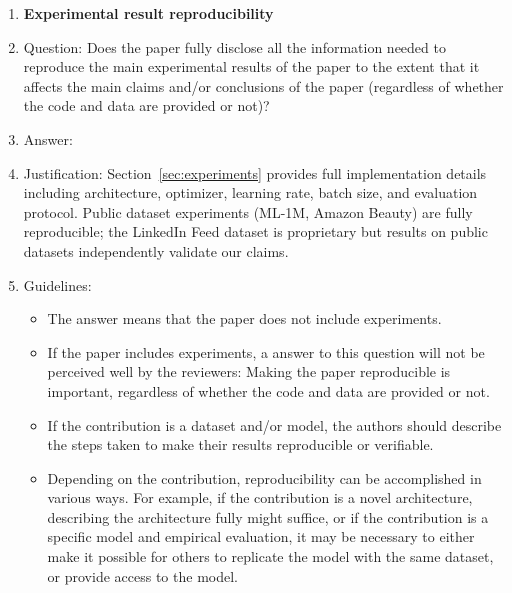 \begin{enumerate}
\item {\bf Experimental result reproducibility}
    \item[] Question: Does the paper fully disclose all the information needed to reproduce the main experimental results of the paper to the extent that it affects the main claims and/or conclusions of the paper (regardless of whether the code and data are provided or not)?
    \item[] Answer: \answerYes{}
    \item[] Justification: Section~\ref{sec:experiments} provides full implementation details including architecture, optimizer, learning rate, batch size, and evaluation protocol. Public dataset experiments (ML-1M, Amazon Beauty) are fully reproducible; the LinkedIn Feed dataset is proprietary but results on public datasets independently validate our claims.
    \item[] Guidelines:
    \begin{itemize}
        \item The answer \answerNA{} means that the paper does not include experiments.
        \item If the paper includes experiments, a \answerNo{} answer to this question will not be perceived well by the reviewers: Making the paper reproducible is important, regardless of whether the code and data are provided or not.
        \item If the contribution is a dataset and/or model, the authors should describe the steps taken to make their results reproducible or verifiable.
        \item Depending on the contribution, reproducibility can be accomplished in various ways. For example, if the contribution is a novel architecture, describing the architecture fully might suffice, or if the contribution is a specific model and empirical evaluation, it may be necessary to either make it possible for others to replicate the model with the same dataset, or provide access to the model.
    \end{itemize}


\end{enumerate}
